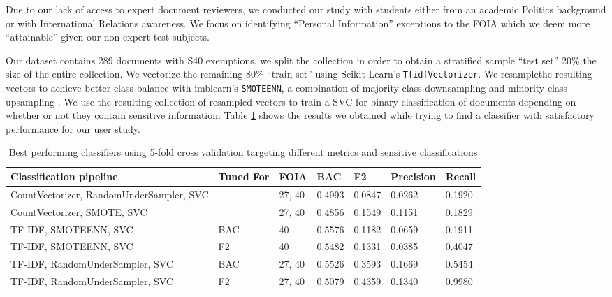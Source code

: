 \documentclass[\version]{l4proj}
\begin{document}
Due to our lack of access to expert document reviewers, we conducted our study with students either from an academic Politics background or with International Relations awareness.
We focus on identifying ``Personal Information'' exceptions to the FOIA which we deem more ``attainable'' given our non-expert test subjects.

Our dataset contains 289 documents with S40 exemptions, we split the collection in order to obtain a stratified sample ``test set'' 20\% the size of the entire collection.
We vectorize the remaining 80\% ``train set'' using Scikit-Learn's \verb|TfidfVectorizer|.
We resamplethe resulting vectors to achieve better class balance with imblearn's \verb|SMOTEENN|, a combination of majority class downsampling and minority class upsampling \autocite{lemaitreImbalancedlearnPythonToolbox2017}.
We use the resulting collection of resampled vectors to train a SVC for binary classification of documents depending on whether or not they contain sensitive information.
Table \ref{tab:clf_perf} shows the results we obtained while trying to find a classifier with satisfactory performance for our user study.

\begin{table}[H]
    \begin{adjustbox}{width=\textwidth,center}
        \begin{tabular}{l|llllll}
            Classification pipeline                  & Tuned For & FOIA   & BAC    & F2     & Precision & Recall \\ \hline
            CountVectorizer, RandomUnderSampler, SVC &           & 27, 40 & 0.4993 & 0.0847 & 0.0262    & 0.1920 \\
            CountVectorizer, SMOTE, SVC              &           & 27, 40 & 0.4856 & 0.1549 & 0.1151    & 0.1829 \\
            TF-IDF, SMOTEENN, SVC                    & BAC       & 40     & 0.5576 & 0.1182 & 0.0659    & 0.1911 \\
            TF-IDF, SMOTEENN, SVC                    & F2        & 40     & 0.5482 & 0.1331 & 0.0385    & 0.4047 \\
            TF-IDF, RandomUnderSampler, SVC          & BAC       & 27, 40 & 0.5526 & 0.3593 & 0.1669    & 0.5454 \\
            TF-IDF, RandomUnderSampler, SVC          & F2        & 27, 40 & 0.5079 & 0.4359 & 0.1340    & 0.9980 \\
        \end{tabular}
    \end{adjustbox}
    \caption{Best performing classifiers using 5-fold cross validation targeting different metrics and sensitive classifications}\label{tab:clf_perf}
\end{table}
\end{document}
